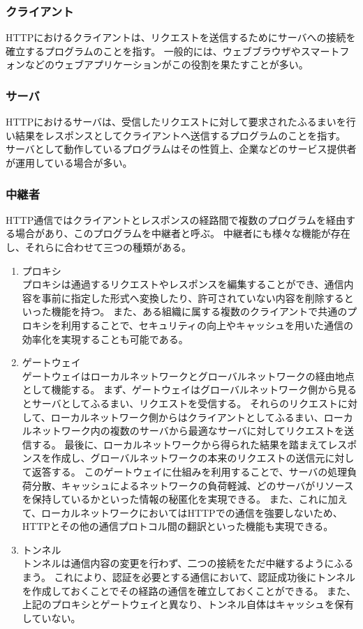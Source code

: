 \documentclass[12pt,a4paper]{jbook}
\begin{document}
\subsubsection{クライアント}
HTTPにおけるクライアントは、リクエストを送信するためにサーバへの接続を確立するプログラムのことを指す。
一般的には、ウェブブラウザやスマートフォンなどのウェブアプリケーションがこの役割を果たすことが多い。

\subsubsection{サーバ}
HTTPにおけるサーバは、受信したリクエストに対して要求されたふるまいを行い結果をレスポンスとしてクライアントへ送信するプログラムのことを指す。
サーバとして動作しているプログラムはその性質上、企業などのサービス提供者が運用している場合が多い。

\subsubsection{中継者}
\label{sec:intermediary}
HTTP通信ではクライアントとレスポンスの経路間で複数のプログラムを経由する場合があり、このプログラムを中継者と呼ぶ。
中継者にも様々な機能が存在し、それらに合わせて三つの種類がある。
\begin{enumerate}
\item プロキシ\\
プロキシは通過するリクエストやレスポンスを編集することができ、通信内容を事前に指定した形式へ変換したり、許可されていない内容を削除するといった機能を持つ。
また、ある組織に属する複数のクライアントで共通のプロキシを利用することで、セキュリティの向上やキャッシュを用いた通信の効率化を実現することも可能である。
\item ゲートウェイ\\
ゲートウェイはローカルネットワークとグローバルネットワークの経由地点として機能する。
まず、ゲートウェイはグローバルネットワーク側から見るとサーバとしてふるまい、リクエストを受信する。
それらのリクエストに対して、ローカルネットワーク側からはクライアントとしてふるまい、ローカルネットワーク内の複数のサーバから最適なサーバに対してリクエストを送信する。
最後に、ローカルネットワークから得られた結果を踏まえてレスポンスを作成し、グローバルネットワークの本来のリクエストの送信元に対して返答する。
このゲートウェイに仕組みを利用することで、サーバの処理負荷分散、キャッシュによるネットワークの負荷軽減、どのサーバがリソースを保持しているかといった情報の秘匿化を実現できる。
また、これに加えて、ローカルネットワークにおいてはHTTPでの通信を強要しないため、HTTPとその他の通信プロトコル間の翻訳といった機能も実現できる。
\item トンネル\\
トンネルは通信内容の変更を行わず、二つの接続をただ中継するようにふるまう。
これにより、認証を必要とする通信において、認証成功後にトンネルを作成しておくことでその経路の通信を確立しておくことができる。
また、上記のプロキシとゲートウェイと異なり、トンネル自体はキャッシュを保有していない。
\end{enumerate}
\end{document}
